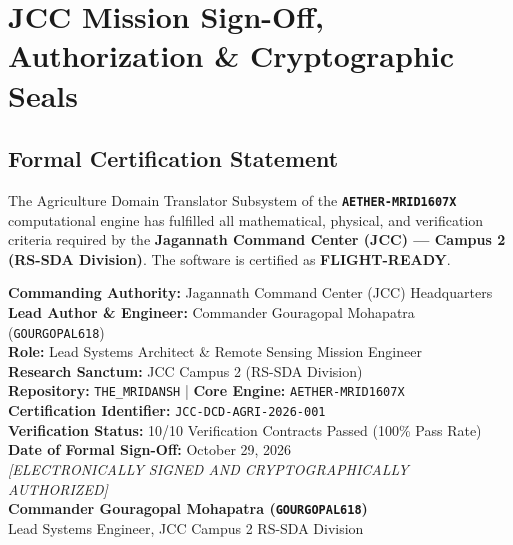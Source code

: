 \documentclass[11pt,a4paper]{article}
\theoremstyle{definition}
\theoremstyle{remark}
\begin{document}
\section{JCC Mission Sign-Off, Authorization \& Cryptographic Seals}

\subsection{Formal Certification Statement}
The Agriculture Domain Translator Subsystem of the \textbf{\texttt{AETHER-MRID1607X}} computational engine has fulfilled all mathematical, physical, and verification criteria required by the \textbf{Jagannath Command Center (JCC) --- Campus 2 (RS-SDA Division)}. The software is certified as \textbf{FLIGHT-READY}.

\begin{tcolorbox}[colback=gray!10!white,colframe=black,title=\textbf{JCC OFFICIAL ENGINEERING AUTHORIZATION}]
\small
\textbf{Commanding Authority:} Jagannath Command Center (JCC) Headquarters \\
\textbf{Lead Author \& Engineer:} Commander Gouragopal Mohapatra (\texttt{GOURGOPAL618}) \\
\textbf{Role:} Lead Systems Architect \& Remote Sensing Mission Engineer \\
\textbf{Research Sanctum:} JCC Campus 2 (RS-SDA Division) \\
\textbf{Repository:} \texttt{THE\_MRIDANSH} \quad | \quad \textbf{Core Engine:} \texttt{AETHER-MRID1607X} \\
\textbf{Certification Identifier:} \texttt{JCC-DCD-AGRI-2026-001} \\
\textbf{Verification Status:} 10/10 Verification Contracts Passed (100\% Pass Rate) \\
\textbf{Date of Formal Sign-Off:} October 29, 2026 \\[0.2cm]
\textit{[ELECTRONICALLY SIGNED AND CRYPTOGRAPHICALLY AUTHORIZED]}\\
\textbf{Commander Gouragopal Mohapatra (\texttt{GOURGOPAL618})}\\
Lead Systems Engineer, JCC Campus 2 RS-SDA Division
\end{tcolorbox}
\end{document}
